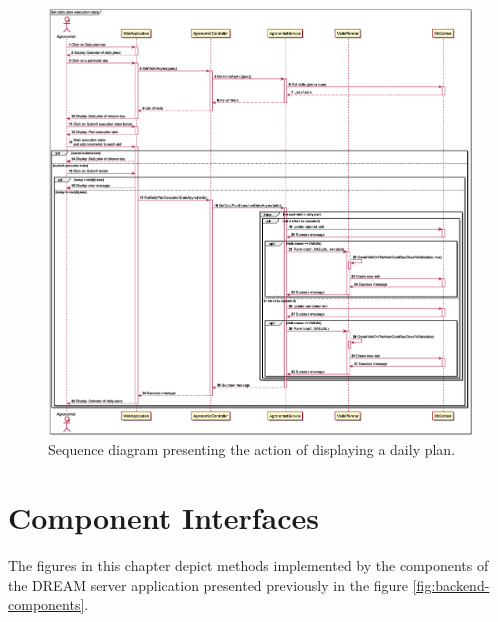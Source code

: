 \begin{figure}
    \centering
    \includegraphics[height=\textheight, width=\textwidth, keepaspectratio, origin=c]{diagrams/sequence/set_daily_plan_execution_state}
    \caption{Sequence diagram presenting the action of displaying a daily plan.}
    \label{fig:sd_set_daily_plan_execution_state}
\end{figure}

\section{Component Interfaces}
The figures in this chapter depict methods implemented by the components of the DREAM server application presented previously in the figure \ref{fig:backend-components}.

